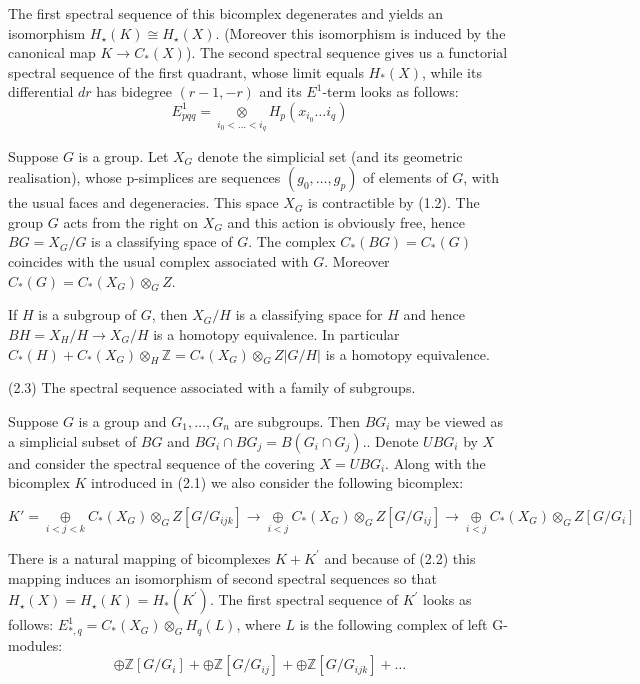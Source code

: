 The first spectral sequence of this bicomplex degenerates and yields an isomorphism $H_{\star}(K) \cong H_{\star}(X)$. (Moreover this isomorphism is induced by the canonical map $K \rightarrow C_*(X)$). The second spectral sequence gives us a functorial spectral sequence of the first quadrant, whose limit equals $H_*(X)$, while its differential $d r$ has bidegree $(r-1,-r)$ and its $E^1$-term looks as follows: $$E_{p q q}^1=\underset{i_0<\ldots<i_q}{\otimes} H_p\left(x_{i_0} \ldots i_q\right)$$

Suppose $G$ is a group. Let $X_G$ denote the simplicial set (and its geometric realisation), whose p-simplices are sequences $\left(g_0, \ldots, g_p\right)$ of elements of $G$, with the usual faces and degeneracies. This space $X_G$ is contractible by (1.2). The group $G$ acts from the right on $X_G$ and this action is obviously free, hence $B G=X_G / G$ is a classifying space of $G$. The complex $C_*(B G)=C_*(G)$ coincides with the usual complex associated with $G$. Moreover $C_*(G)=C_*\left(X_G\right) \otimes_G Z$.

If $H$ is a subgroup of $G$, then $X_G / H$ is a classifying space for $H$ and hence $B H=X_H / H \rightarrow X_G / H$ is a homotopy equivalence. In particular $C_*(H)+C_*\left(X_G\right) \otimes_H \mathbb{Z}=C_*\left(X_G\right) \otimes_G Z|G / H|$ is a homotopy equivalence.

(2.3) The spectral sequence associated with a family of subgroups.

Suppose $G$ is a group and $G_1, \ldots, G_n$ are subgroups. Then $B G_i$ may be viewed as a simplicial subset of $B G$ and $B G_i \cap B G_j=B\left(G_i \cap G_j\right)$.. Denote $U B G_i$ by $X$ and consider the spectral sequence of the covering $X=U B G_i$. Along with the bicomplex $K$ introduced in (2.1) we also consider the following bicomplex:

$$K' = \underset{i<j<k}{\oplus} C_*\left(X_G\right) \otimes_G Z\left[G / G_{i j k}\right] \longrightarrow \underset{i<j}{\oplus} C_*\left(X_G\right) \otimes_G Z\left[G / G_{i j}\right] \longrightarrow \underset{i<j}{\oplus} C_*\left(X_G\right) \otimes_G Z\left[G / G_{i}\right] $$

There is a natural mapping of bicomplexes $K+K^{\prime}$ and because of (2.2) this mapping induces an isomorphism of second spectral sequences so that $H_{\star}(X)=H_{\star}(K)=H_*\left(K^{\prime}\right)$. The first spectral sequence of $K^{\prime}$ looks as follows: $E_{*, q}^1=C_*\left(X_G\right) \otimes_G H_q(L)$, where $L$ is the following complex of left G-modules:
$$
\oplus \mathbb{Z}\left[G / G_i\right]+\oplus \mathbb{Z}\left[G / G_{i j}\right]+\oplus \mathbb{Z}\left[G / G_{i j k}\right]+\ldots
$$


